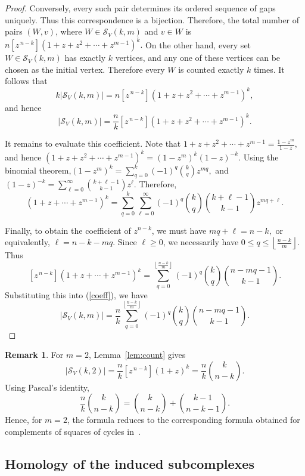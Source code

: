 \documentclass[12pt,reqno]{amsart}
\theoremstyle{definition}
\newtheorem{remark}{Remark}
\numberwithin{equation}{section}
\begin{document}
\begin{proof}
	Conversely, every such pair determines its ordered sequence of gaps
	uniquely. Thus this correspondence is a bijection. Therefore, the total number
	of pairs $(W,v)$, where \( W\in\mathcal{S}_V(k,m) \) and \( v\in W \) is \( n[z^{\,n-k}]
	(1+z+z^2+\cdots+z^{m-1})^k. \)
	On the other hand, every set $W\in\mathcal{S}_V(k,m)$ has exactly $k$
	vertices, and any one of these vertices can be chosen as the initial
	vertex. Therefore every $W$ is counted exactly $k$ times. It follows that
	\[
	k\left|\mathcal{S}_V(k,m)\right|
	=
	n[z^{\,n-k}]
	(1+z+z^2+\cdots+z^{m-1})^k,
	\]
	and hence
	\begin{equation}\label{coeff}
		\left|\mathcal{S}_V(k,m)\right|
		=
		\frac{n}{k}
		[z^{\,n-k}]
		(1+z+z^2+\cdots+z^{m-1})^k.
	\end{equation}
	
	It remains to evaluate this coefficient. Note that
	\( 1+z+z^2+\cdots+z^{m-1}
	=
	\frac{1-z^m}{1-z}, \) and hence
	\( 	(1+z+z^2+\cdots+z^{m-1})^k
	=
	(1-z^m)^k(1-z)^{-k}. \) Using the binomial theorem,\( (1-z^m)^k =
	\sum_{q=0}^{k}
	(-1)^q\binom{k}{q}z^{mq}, \) and \( (1-z)^{-k}
	=
	\sum_{\ell=0}^{\infty}
	\binom{k+\ell-1}{k-1}z^\ell. \) Therefore,
	\[
	(1+z+\cdots+z^{m-1})^k
	=
	\sum_{q=0}^{k}\sum_{\ell=0}^{\infty}
	(-1)^q
	\binom{k}{q}
	\binom{k+\ell-1}{k-1}
	z^{mq+\ell}.
	\]
	
	Finally, to obtain the coefficient of $z^{n-k}$, we must have \( mq+\ell=n-k, \) or equivalently,
	\( \ell=n-k-mq. \)
	Since $\ell\geq0$, we necessarily have \( 0\leq q\leq
	\left\lfloor\frac{n-k}{m}\right\rfloor. \)
	Thus
	\[
	[z^{\,n-k}]
	(1+z+\cdots+z^{m-1})^k
	=
	\sum_{q=0}^{\left\lfloor\frac{n-k}{m}\right\rfloor}
	(-1)^q
	\binom{k}{q}
	\binom{n-mq-1}{k-1}.
	\]
	Substituting this into  (\ref{coeff}), we have
	\[
	\left|\mathcal{S}_V(k,m)\right|
	=
	\frac{n}{k}
	\sum_{q=0}^{\left\lfloor\frac{n-k}{m}\right\rfloor}
	(-1)^q
	\binom{k}{q}
	\binom{n-mq-1}{k-1}.
	\]
\end{proof}
\begin{remark}
	For $m=2$, Lemma~\ref{lem:count} gives
	\[
	\left|\mathcal{S}_V(k,2)\right|
	=
	\frac{n}{k}[z^{\,n-k}](1+z)^k
	=
	\frac{n}{k}\binom{k}{n-k}.
	\]
	Using Pascal's identity,
	\[
	\frac{n}{k}\binom{k}{n-k}
	=
	\binom{k}{n-k}
	+
	\binom{k-1}{n-k-1}.
	\]
Hence, for $m=2$, the formula reduces to the corresponding formula
obtained for complements of squares of cycles in~\cite{RatherSquare}.
\end{remark}

\subsection{Homology of the induced subcomplexes}
\end{document}
